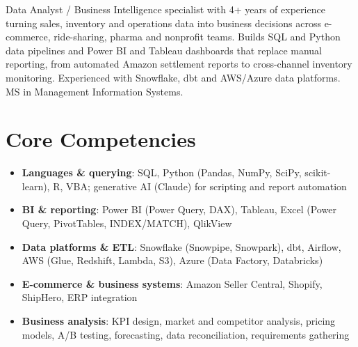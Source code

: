 \documentclass[11pt,a4paper,sans]{moderncv}
\begin{document}
\makecvtitle


\vspace{6pt}
\small{Data Analyst / Business Intelligence specialist with 4+ years of experience turning sales, inventory and operations data into business decisions across e-commerce, ride-sharing, pharma and nonprofit teams. Builds SQL and Python data pipelines and Power BI and Tableau dashboards that replace manual reporting, from automated Amazon settlement reports to cross-channel inventory monitoring. Experienced with Snowflake, dbt and AWS/Azure data platforms. MS in Management Information Systems.}


\section{Core Competencies}
\vspace{1pt}
\begin{itemize}
\item \textbf{Languages \& querying}: SQL, Python (Pandas, NumPy, SciPy, scikit-learn), R, VBA; generative AI (Claude) for scripting and report automation
\item \textbf{BI \& reporting}: Power BI (Power Query, DAX), Tableau, Excel (Power Query, PivotTables, INDEX/MATCH), QlikView
\item \textbf{Data platforms \& ETL}: Snowflake (Snowpipe, Snowpark), dbt, Airflow, AWS (Glue, Redshift, Lambda, S3), Azure (Data Factory, Databricks)
\item \textbf{E-commerce \& business systems}: Amazon Seller Central, Shopify, ShipHero, ERP integration
\item \textbf{Business analysis}: KPI design, market and competitor analysis, pricing models, A/B testing, forecasting, data reconciliation, requirements gathering
\end{itemize}

\end{document}
